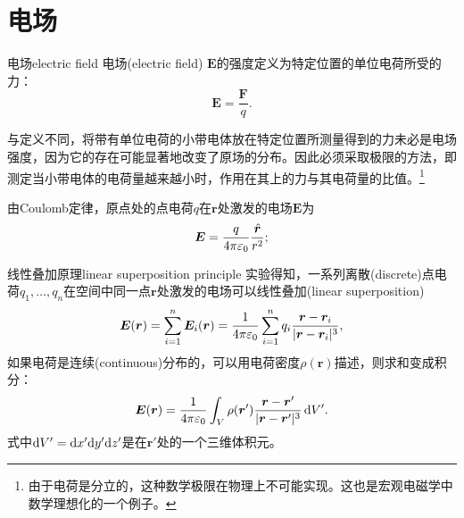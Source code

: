 
\section{电场}

\begin{definition}{电场}{electric field}
    电场(electric field) $\bm E$的强度定义为特定位置的单位电荷所受的力：
    \begin{equation}
        \bm E = \frac{\bm F}q.%
    \end{equation}
\end{definition}
\begin{remark}
    与定义不同，将带有单位电荷的小带电体放在特定位置所测量得到的力未必是电场强度，因为它的存在可能显著地改变了原场的分布。因此必须采取极限的方法，即测定当小带电体的电荷量越来越小时，作用在其上的力与其电荷量的比值。\footnote{由于电荷是分立的，这种数学极限在物理上不可能实现。这也是宏观电磁学中数学理想化的一个例子。}
\end{remark}

\begin{corollary}
    由Coulomb定律，原点处的点电荷$q$在$\bm r$处激发的电场$\bm E$为
    \begin{equation}
        \label{eqn:E of q}
        \bm E = \frac{q}{4\pi\varepsilon_0}\frac{\mathop{}\!\hat{\bm{r}}}{r^2};
    \end{equation}
\end{corollary}

\begin{theorem}
    {线性叠加原理}{linear superposition principle}
    实验得知，一系列离散(discrete)点电荷$q_1,\ldots,q_n$在空间中同一点$\bm r$处激发的电场可以线性叠加(linear superposition)
    \begin{equation}
        \label{eqn:E(r) sum}
        \bm E(\bm r) = \sum_{i=1}^n\bm E_i(\bm r) = \frac1{4\pi\varepsilon_0}\sum_{i=1}^nq_i\frac{\bm r - \bm r_i}{\lvert\bm r - \bm r_i\rvert^3},
    \end{equation}
    如果电荷是连续(continuous)分布的，可以用电荷密度$\rho(\bm r)$描述，则求和变成积分：
    \begin{equation}
        \label{eqn:E(r)}
        \bm E(\bm r) = \frac1{4\pi\varepsilon_0}\int_V\rho(\bm r')\frac{\bm r - \bm r'}{\lvert\bm r - \bm r'\rvert^3}\mathop{}\!\mathrm{d} V'.
    \end{equation}
    式中$\mathop{}\!\mathrm{d} V' = \mathop{}\!\mathrm{d} x'\mathrm{d} y'\mathrm{d} z'$是在$\bm r'$处的一个三维体积元。
\end{theorem}

